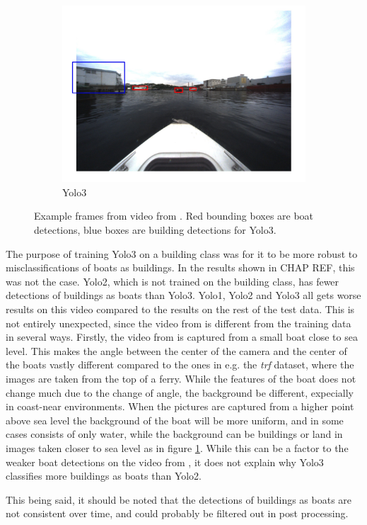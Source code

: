 \begin{figure}[h!]
\begin{subfigure}[b]{0.6\textwidth}
   \includegraphics[width=1\linewidth]{results/kamsvag/yolo3_figure_1479.jpg}
   \caption{Yolo3}
\end{subfigure}
\caption{Example frames from video from \citep{Kamsvag2018}. Red bounding boxes are boat detections, blue boxes are building detections for Yolo3.}
\label{fig:kamsvaag_vid}
\end{figure}


The purpose of training Yolo3 on a building class was for it to be more robust to misclassifications of boats as buildings. In the results shown in CHAP REF, this was not the case. Yolo2, which is not trained on the building class, has fewer detections of buildings as boats than Yolo3. Yolo1, Yolo2 and Yolo3 all gets worse results on this video compared to the results on the rest of the test data. This is not entirely unexpected, since the video from \citep{Kamsvag2018} is different from the training data in several ways. Firstly, the video from \citep{Kamsvag2018} is captured from a small boat close to sea level. This makes the angle between the center of the camera and the center of the boats vastly different compared to the ones in e.g. the \textit{trf} dataset, where the images are taken from the top of a ferry. While the features of the boat does not change much due to the change of angle, the background be different, expecially in coast-near environments. When the pictures are captured from a higher point above sea level the background of the boat will be more uniform, and in some cases consists of only water, while the background can be buildings or land in images taken closer to sea level as in figure \ref{fig:kamsvaag_vid}. While this can be a factor to the weaker boat detections on the video from \citep{Kamsvag2018}, it does not explain why Yolo3 classifies more buildings as boats than Yolo2.

\vspace{3mm}

This being said, it should be noted that the detections of buildings as boats are not consistent over time, and could probably be filtered out in post processing.